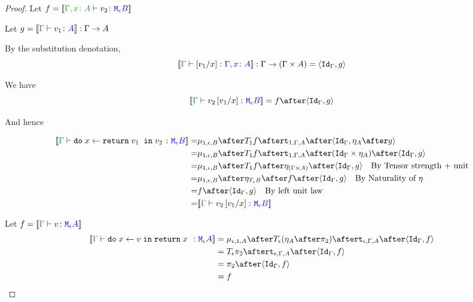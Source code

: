 \documentclass{report}
\begin{document}
\begin{framed}
\begin{proof}
        
        Let $f = \deno{\typerelation{\gax}{v_2}{\meb}}$
        
        Let $g = \deno{\gtyperelation{v_1}{A}}: \G \rightarrow A$
        
        By the substitution denotation, $$\deno{\typerelation{\G}{\ssub{x}{v_1}}{\gax}}: \G \rightarrow (\G \times A) = \pr{\idg}{g}$$
        
        We have $$\deno{\gtyperelation{v_2\ssub{x}{v_1}}{\meb}} = f \after \pr{\idg}{g}$$
        
        And hence
        
        \begin{equation}
            \begin{split}
                \deno{\gtyperelation{\doin{x}{\return{v_1}}{v_2}}{\meb}} = &  \bind{\1}{\e}{B} \after \T{\1}{f} \after \tstrength{1}{\G}{A} \after \pr{\idg}{\point{A}\after g} \\
                = & \bind{\1}{\e}{B} \after \T{\1}{f} \after \tstrength{1}{\G}{A} \after (\idg\times \point{A}) \after \pr{\idg}{g} \\
                = & \bind{\1}{\e}{B} \after \T{\1}{f} \after \point{(\G \times A)} \after \pr{\idg}{g} \qt{By Tensor strength + unit}\\
                = & \bind{\1}{\e}{B}\after\point{\teb}\after f\after\pr{\idg}{g} \qt{By Naturality of $\point{}$}\\
                = & f\after\pr{\idg}{g} \qt{By left unit law}\\
                = & \deno{\gtyperelation{v_2\ssub{x}{v_1}}{\meb}}\\
            \end{split}
        \end{equation}
        
        
        
        
        
        Let $f = \deno{\gtyperelation{v}{\mea}}$ 
            \begin{equation}
            \begin{split}
                \deno{\gtyperelation{\doin{x}{v}{\return{x}}}{\mea}}  & = \bind{\e}{\1}{A} \after \T{\e}{(\point{A} \after \pp)} \after \tstrength{\e}{\G}{A}\after \pr{\idg}{f} \\
                & = \T{\e}{\pp} \after \tstrength{\e}{\G}{A} \after \pr {\idg}{f} \\
                & = \pp \after \pr{\idg}{f}\\
                & = f
            \end{split}
        \end{equation}
        

\end{proof}
\end{framed}
\end{document}
